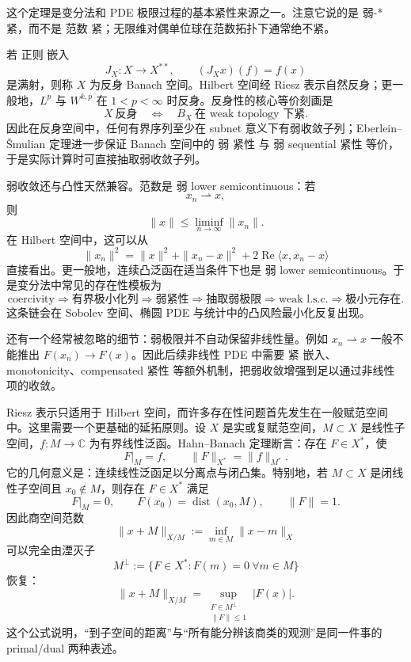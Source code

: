 这个定理是变分法和 PDE 极限过程的基本紧性来源之一。注意它说的是 弱-* 紧，而不是 范数 紧；无限维对偶单位球在范数拓扑下通常绝不紧。

若 正则 嵌入
\[
J_X:X\to X^{**},
\qquad
(J_Xx)(f)=f(x)
\]
是满射，则称 $X$ 为反身 Banach 空间。Hilbert 空间经 Riesz 表示自然反身；更一般地，$L^p$ 与 $W^{k,p}$ 在 $1<p<\infty$ 时反身。反身性的核心等价刻画是
\begin{equation*}X\ \text{反身}
\quad\Longleftrightarrow\quad
B_X\ \text{在 weak topology 下紧}.\end{equation*}
因此在反身空间中，任何有界序列至少在 subnet 意义下有弱收敛子列；Eberlein--\v Smulian 定理进一步保证 Banach 空间中的 弱 紧性 与 弱 sequential 紧性 等价，于是实际计算时可直接抽取弱收敛子列。

弱收敛还与凸性天然兼容。范数是 弱 lower semicontinuous：若
\[
x_n\rightharpoonup x,
\]
则
\begin{equation*}\|x\|\le\liminf_{n\to\infty}\|x_n\|.\end{equation*}
在 Hilbert 空间中，这可以从
\[
\|x_n\|^2
=\|x\|^2+\|x_n-x\|^2
+2\operatorname{Re}\langle x,x_n-x\rangle
\]
直接看出。更一般地，连续凸泛函在适当条件下也是 弱 lower semicontinuous。于是变分法中常见的存在性模板为
\[
\text{coercivity}
\Rightarrow
\text{有界极小化列}
\Rightarrow
\text{弱紧性}
\Rightarrow
\text{抽取弱极限}
\Rightarrow
\text{weak l.s.c.}
\Rightarrow
\text{极小元存在}.
\]
这条链会在 Sobolev 空间、椭圆 PDE 与统计中的凸风险最小化反复出现。

还有一个经常被忽略的细节：弱极限并不自动保留非线性量。例如 $x_n\rightharpoonup x$ 一般不能推出 $F(x_n)\to F(x)$。因此后续非线性 PDE 中需要 紧 嵌入、monotonicity、compensated 紧性 等额外机制，把弱收敛增强到足以通过非线性项的收敛。

Riesz 表示只适用于 Hilbert 空间，而许多存在性问题首先发生在一般赋范空间中。这里需要一个更基础的延拓原则。设 $X$ 是实或复赋范空间，$M\subset X$ 是线性子空间，$f:M\to\mathbb C$ 为有界线性泛函。Hahn--Banach 定理断言：存在 $F\in X^*$，使
\[
F|_M=f,
\qquad
\|F\|_{X^*}=\|f\|_{M^*}.
\]
它的几何意义是：连续线性泛函足以分离点与闭凸集。特别地，若 $M\subset X$ 是闭线性子空间且 $x_0\notin M$，则存在 $F\in X^*$ 满足
\[
F|_M=0,
\qquad
F(x_0)=\operatorname{dist}(x_0,M),
\qquad
\|F\|=1.
\]
因此商空间范数
\[
\|x+M\|_{X/M}:=\inf_{m\in M}\|x-m\|_X
\]
可以完全由湮灭子
\[
M^\perp:=\{F\in X^*:F(m)=0\ \forall m\in M\}
\]
恢复：
\[
\boxed{
\|x+M\|_{X/M}
=
\sup_{\substack{F\in M^\perp\\ \|F\|\le1}}|F(x)|
}.
\]
这个公式说明，``到子空间的距离''与``所有能分辨该商类的观测''是同一件事的 primal/dual 两种表述。

